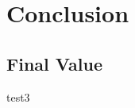 \chapter{Conclusion}
\label{chapter:Conclusion}
\thispagestyle{myheadings} %

\section{Final Value}
\label{sec:FinalValue}

test3
